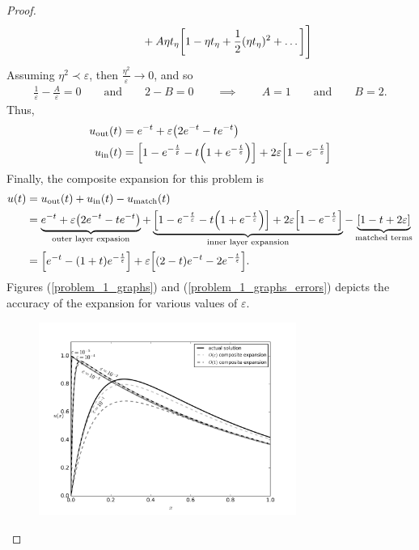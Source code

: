 \documentclass{article} %
\theoremstyle{plain}
\newcommand{\E}{\varepsilon}
\numberwithin{equation}{section} %
\numberwithin{figure}{section} %
\numberwithin{table}{section} %
\begin{document}
\begin{proof}
\begin{align*}
        &\qquad \qquad + A\eta t_\eta\qty[1 - \eta t_\eta + \frac{1}{2} (\eta t_\eta)^2 + \dots]\Bigg]
    \end{align*}
    Assuming $\eta^2 \prec \E$, then $\frac{\eta^2}{\E} \rightarrow 0$, and so
    \begin{align*}
        \frac{1}{\E} - \frac{A}{\E} = 0 \qquad \text{and} \qquad 2 - B = 0 \qquad \implies \qquad A = 1 \qquad \text{and} \qquad B = 2.
    \end{align*}
    Thus,
    \begin{align*}
        u_{\text{out}}(t) &= e^{-t} + \E\qty(2e^{-t} - te^{-t}) \\
        u_{\text{in}}(t) &= \qty[1 - e^{-\frac{t}{\E}} - t\qty(1 + e^{-\frac{t}{\E}})] + 2\E\qty[1 - e^{-\frac{t}{\E}}]
    \end{align*}
    Finally, the composite expansion for this problem is
    \begin{align*}
        u(t) &= u_{\text{out}}(t) + u_{\text{in}}(t) - u_{\text{match}}(t) \\
        &= \underbrace{e^{-t} + \E\qty(2e^{-t} - te^{-t})}_{\text{outer layer expasion}} + \underbrace{\qty[1 - e^{-\frac{t}{\E}} - t\qty(1 + e^{-\frac{t}{\E}})] + 2\E\qty[1 - e^{-\frac{t}{\E}}]}_{\text{inner layer expansion}} - \underbrace{\qty[1 - t + 2\E]}_{\text{matched terms}}\\
        &= \qty[e^{-t} - (1 + t)e^{-\frac{t}{\E}}] + \E\qty[(2 - t)e^{-t} - 2e^{-\frac{t}{\E}}].
    \end{align*}
    Figures (\ref{problem_1_graphs}) and (\ref{problem_1_graphs_errors}) depicts the accuracy of the expansion for various values of $\E$.
    \begin{figure}
        \centering
        \includegraphics[width=0.75\textwidth]{standard.png}\vspace{-0.22cm}

\end{figure}
\end{proof}
\end{document}
